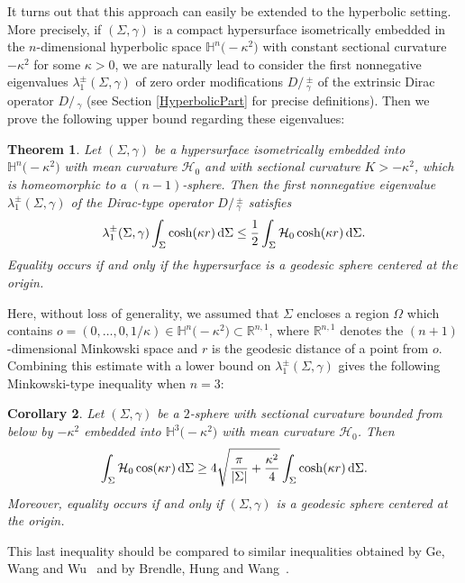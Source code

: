 \documentclass[10pt,a4paper]{amsart}
\numberwithin{equation}{section}
\newtheorem{Theorem}{Theorem}[section]
\newtheorem{Corollary}[Theorem]{Corollary}
\def\D{D\!\!\!\!/\,}
\begin{document}
It turns out that this approach can easily be extended to the hyperbolic setting. More precisely, if $(\Sigma,\gamma)$ is a compact hypersurface isometrically embedded in the $n$-dimensional hyperbolic space $\mathbb{H}^n\bigl(-\kappa^2\bigr)$ with constant sectional curvature $-\kappa^2$ for some $\kappa>0$, we are naturally lead to consider the first nonnegative eigenvalues $\lambda_1^\pm(\Sigma,\gamma)$ of zero order modifications $\D_\gamma^\pm$ of the extrinsic Dirac operator $\D_\gamma$ (see Section \ref{HyperbolicPart} for precise definitions). Then we prove the following upper bound regarding these eigenvalues:
\begin{Theorem}\label{NewUpperBoundHyperbolique}
Let $(\Sigma,\gamma)$ be a hypersurface isometrically embedded into $\mathbb{H}^n\bigl(-\kappa^2\bigr)$ with mean curvature $\mathcal{H}_0$ and with sectional curvature $K>-\kappa^2$, which is homeomorphic to a $(n-1)$-sphere. Then the first nonnegative eigenvalue $\lambda_1^\pm(\Sigma,\gamma)$ of the Dirac-type operator $\D_\gamma^\pm$ satisfies
\begin{gather}\label{NewUpperBoundHyp1}
\lambda_1^\pm(\Sigma,\gamma)\int_\Sigma \cosh(\kappa r)\,{\rm d}\Sigma\leq\frac{1}{2}\int_\Sigma \mathcal{H}_0\cosh(\kappa r)\,{\rm d}\Sigma.
\end{gather}
Equality occurs if and only if the hypersurface is a geodesic sphere centered at the origin.
\end{Theorem}
Here, without loss of generality, we assumed that $\Sigma$ encloses a region $\Omega$ which contains $o=(0,\dots,0,1/\kappa)\in\mathbb{H}^n\bigl(-\kappa^2\bigr)\subset\mathbb{R}^{n,1}$, where $\mathbb{R}^{n,1}$ denotes the $(n+1)$-dimensional Minkowski space and $r$ is the geodesic distance of a point from $o$. Combining this estimate with a lower bound on $\lambda_1^\pm(\Sigma,\gamma)$ gives the following Minkowski-type inequality when $n=3$:
\begin{Corollary}\label{MinkowskiHyperbolic}
Let $(\Sigma,\gamma)$ be a $2$-sphere with sectional curvature bounded from below by $-\kappa^2$ embedded into $\mathbb{H}^3\bigl(-\kappa^2\bigr)$ with mean curvature $\mathcal{H}_0$. Then
\begin{gather}\label{MinkowskiHyperbolic1}
\int_\Sigma\mathcal{H}_0\cos(\kappa r)\,{\rm d}\Sigma\geq 4\sqrt{\frac{\pi}{|\Sigma|}+\frac{\kappa^2}{4}}\int_\Sigma\cosh(\kappa r)\,{\rm d}\Sigma.
\end{gather}
Moreover, equality occurs if and only if $(\Sigma,\gamma)$ is a geodesic sphere centered at the origin.
\end{Corollary}
This last inequality should be compared to similar inequalities obtained by Ge, Wang and Wu~\cite{GeWangWu} and by Brendle, Hung and Wang~\cite{BrendleHungWang}.
\end{document}
